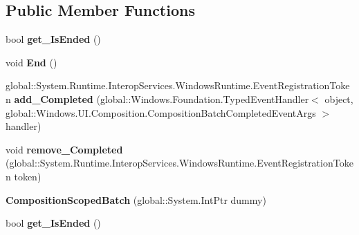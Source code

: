 \subsection*{Public Member Functions}
\begin{DoxyCompactItemize}
\item 
\mbox{\label{class_windows_1_1_u_i_1_1_composition_1_1_composition_scoped_batch_ad036352a5e49eca6ca9a5625c9241c44}} 
bool {\bfseries get\+\_\+\+Is\+Ended} ()
\item 
\mbox{\label{class_windows_1_1_u_i_1_1_composition_1_1_composition_scoped_batch_ac9207d343cd71dfa95d2843f2cad44a3}} 
void {\bfseries End} ()
\item 
\mbox{\label{class_windows_1_1_u_i_1_1_composition_1_1_composition_scoped_batch_a2eaf35d8ee5b83da80dbb51535e15735}} 
global\+::\+System.\+Runtime.\+Interop\+Services.\+Windows\+Runtime.\+Event\+Registration\+Token {\bfseries add\+\_\+\+Completed} (global\+::\+Windows.\+Foundation.\+Typed\+Event\+Handler$<$ object, global\+::\+Windows.\+U\+I.\+Composition.\+Composition\+Batch\+Completed\+Event\+Args $>$ handler)
\item 
\mbox{\label{class_windows_1_1_u_i_1_1_composition_1_1_composition_scoped_batch_a1fca5e233b1f087147733edf215d083d}} 
void {\bfseries remove\+\_\+\+Completed} (global\+::\+System.\+Runtime.\+Interop\+Services.\+Windows\+Runtime.\+Event\+Registration\+Token token)
\item 
\mbox{\label{class_windows_1_1_u_i_1_1_composition_1_1_composition_scoped_batch_aabd378de67b654d720bcd539222f242d}} 
{\bfseries Composition\+Scoped\+Batch} (global\+::\+System.\+Int\+Ptr dummy)
\item 
\mbox{\label{class_windows_1_1_u_i_1_1_composition_1_1_composition_scoped_batch_ad036352a5e49eca6ca9a5625c9241c44}} 
bool {\bfseries get\+\_\+\+Is\+Ended} ()
\item 

\end{DoxyCompactItemize}
